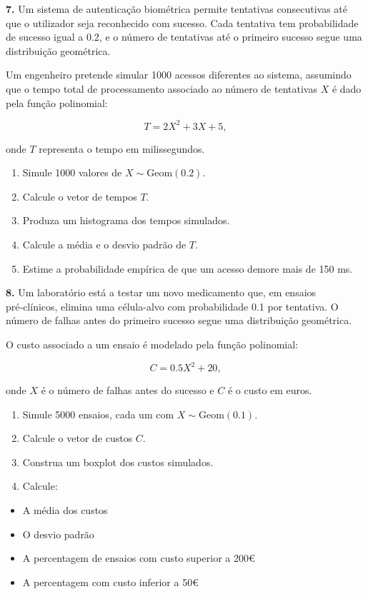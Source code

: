 \documentclass[
]{book}
\providecommand{\tightlist}{%
  \setlength{\itemsep}{0pt}\setlength{\parskip}{0pt}}
\begin{document}
\textbf{7.} Um sistema de autenticação biométrica permite tentativas consecutivas até que o utilizador seja reconhecido com sucesso. Cada tentativa tem probabilidade de sucesso igual a 0.2, e o número de tentativas até o primeiro sucesso segue uma distribuição geométrica.

Um engenheiro pretende simular 1000 acessos diferentes ao sistema, assumindo que o tempo total de processamento associado ao número de tentativas \(X\) é dado pela função polinomial:

\[T = 2X^2 + 3X + 5,\]

onde \(T\) representa o tempo em milissegundos.

\begin{enumerate}
\def\labelenumi{(\alph{enumi})}
\item
  Simule 1000 valores de \(X \sim \text{Geom}(0.2)\).
\item
  Calcule o vetor de tempos \(T\).
\item
  Produza um histograma dos tempos simulados.
\item
  Calcule a média e o desvio padrão de \(T\).
\item
  Estime a probabilidade empírica de que um acesso demore mais de 150 ms.
\end{enumerate}

\textbf{8.} Um laboratório está a testar um novo medicamento que, em ensaios pré‑clínicos, elimina uma célula-alvo com probabilidade 0.1 por tentativa. O número de falhas antes do primeiro sucesso segue uma distribuição geométrica.

O custo associado a um ensaio é modelado pela função polinomial:

\[C = 0.5X^2 + 20,\]

onde \(X\) é o número de falhas antes do sucesso e \(C\) é o custo em euros.

\begin{enumerate}
\def\labelenumi{(\alph{enumi})}
\item
  Simule 5000 ensaios, cada um com \(X \sim \text{Geom}(0.1)\).
\item
  Calcule o vetor de custos \(C\).
\item
  Construa um boxplot dos custos simulados.
\item
  Calcule:
\end{enumerate}

\begin{itemize}
\tightlist
\item
  A média dos custos
\item
  O desvio padrão
\item
  A percentagem de ensaios com custo superior a 200€
\item
  A percentagem com custo inferior a 50€
\end{itemize}
\end{document}
